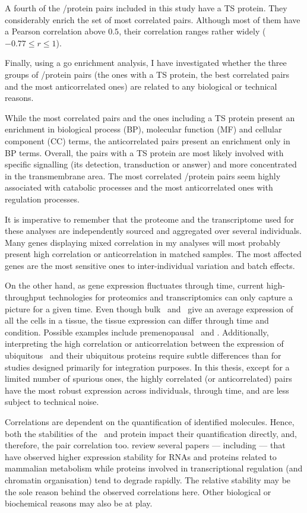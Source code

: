 A fourth of the \mRNA/protein pairs included in this study have a \gls{TS} protein.
They considerably enrich the set of most correlated pairs.
Although most of them have a Pearson correlation above $0.5$,
their correlation ranges rather widely ($-0.77 ≤ r≤ 1$).

Finally, using a \gls{go} enrichment analysis,
I have investigated whether the three groups of \mRNA/protein pairs
(the ones with a \gls{TS} protein, the best correlated pairs
and the most anticorrelated ones) are related to
any biological or technical reasons.

While the most correlated pairs and the ones including a \gls{TS} protein
present an enrichment in biological process (BP),
molecular function (MF) and cellular component (CC) terms,
the anticorrelated pairs present an enrichment only in BP terms.
Overall, the pairs with a \gls{TS} protein are most likely involved
with specific signalling (its detection, transduction or answer)
and more concentrated in the transmembrane area.
The most correlated \mRNA/protein pairs seem highly associated
with catabolic processes
and the most anticorrelated ones with regulation processes.

It is imperative to remember that the proteome and the transcriptome used
for these analyses are independently sourced and aggregated over several individuals.
Many genes displaying mixed correlation in my analyses will most probably
present high correlation or anticorrelation in matched samples.
The most affected genes are the most sensitive ones
to inter-individual variation and batch effects.

On the other hand,
as gene expression fluctuates through time,
current high-throughput technologies
for proteomics and transcriptomics can only capture a picture for a given time.
Even though bulk \Rnaseq\ and \ms\ give an average expression
of all the cells in a tissue,
the tissue expression can differ through time and condition.
Possible examples include premenopausal \Ovary\ and \Uterus.
Additionally, interpreting the high correlation or anticorrelation
between the expression of ubiquitous \mRNAs\ and their ubiquitous proteins
require subtle differences than for studies designed primarily
for integration purposes.
In this thesis,
except for a limited number of spurious ones,
the highly correlated (or anticorrelated) pairs have
the most robust expression across individuals, through time,
and are less subject to technical noise.

Correlations are dependent on the quantification of identified molecules.
Hence, both the stabilities of the \mRNA\ and protein impact
their quantification directly, and, therefore, the pair correlation too.
\citet{Vogel2012-sq} review several papers
--- including \citet{schwanhausserglobal:2011} ---
that have observed higher expression stability for
\glspl{RNA} and proteins related to mammalian metabolism
while proteins involved in transcriptional regulation (and chromatin organisation)
tend to degrade rapidly.
The relative stability may be the sole reason behind the observed correlations here.
Other biological or biochemical reasons may also be at play.

